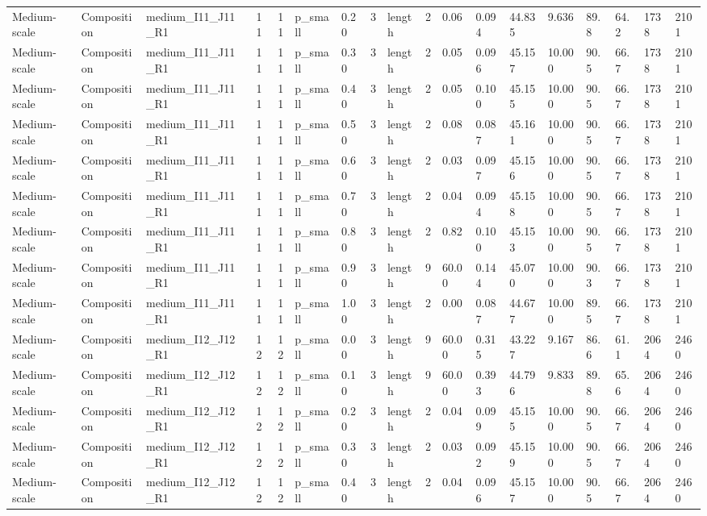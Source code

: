 \begin{longtable}{lllrrllllrllllllll}
Medium-scale & Composition & medium\_I11\_J11\_R1 & 11 & 11 & p\_small & 0.20 & 3 & length & 2 & 0.06 & 0.094 & 44.835 & 9.636 & 89.8 & 64.2 & 1738 & 2101 \\
Medium-scale & Composition & medium\_I11\_J11\_R1 & 11 & 11 & p\_small & 0.30 & 3 & length & 2 & 0.05 & 0.096 & 45.157 & 10.000 & 90.5 & 66.7 & 1738 & 2101 \\
Medium-scale & Composition & medium\_I11\_J11\_R1 & 11 & 11 & p\_small & 0.40 & 3 & length & 2 & 0.05 & 0.100 & 45.155 & 10.000 & 90.5 & 66.7 & 1738 & 2101 \\
Medium-scale & Composition & medium\_I11\_J11\_R1 & 11 & 11 & p\_small & 0.50 & 3 & length & 2 & 0.08 & 0.087 & 45.161 & 10.000 & 90.5 & 66.7 & 1738 & 2101 \\
Medium-scale & Composition & medium\_I11\_J11\_R1 & 11 & 11 & p\_small & 0.60 & 3 & length & 2 & 0.03 & 0.097 & 45.156 & 10.000 & 90.5 & 66.7 & 1738 & 2101 \\
Medium-scale & Composition & medium\_I11\_J11\_R1 & 11 & 11 & p\_small & 0.70 & 3 & length & 2 & 0.04 & 0.094 & 45.158 & 10.000 & 90.5 & 66.7 & 1738 & 2101 \\
Medium-scale & Composition & medium\_I11\_J11\_R1 & 11 & 11 & p\_small & 0.80 & 3 & length & 2 & 0.82 & 0.100 & 45.153 & 10.000 & 90.5 & 66.7 & 1738 & 2101 \\
Medium-scale & Composition & medium\_I11\_J11\_R1 & 11 & 11 & p\_small & 0.90 & 3 & length & 9 & 60.00 & 0.144 & 45.070 & 10.000 & 90.3 & 66.7 & 1738 & 2101 \\
Medium-scale & Composition & medium\_I11\_J11\_R1 & 11 & 11 & p\_small & 1.00 & 3 & length & 2 & 0.00 & 0.087 & 44.677 & 10.000 & 89.5 & 66.7 & 1738 & 2101 \\
Medium-scale & Composition & medium\_I12\_J12\_R1 & 12 & 12 & p\_small & 0.00 & 3 & length & 9 & 60.00 & 0.315 & 43.227 & 9.167 & 86.6 & 61.1 & 2064 & 2460 \\
Medium-scale & Composition & medium\_I12\_J12\_R1 & 12 & 12 & p\_small & 0.10 & 3 & length & 9 & 60.00 & 0.393 & 44.796 & 9.833 & 89.8 & 65.6 & 2064 & 2460 \\
Medium-scale & Composition & medium\_I12\_J12\_R1 & 12 & 12 & p\_small & 0.20 & 3 & length & 2 & 0.04 & 0.099 & 45.155 & 10.000 & 90.5 & 66.7 & 2064 & 2460 \\
Medium-scale & Composition & medium\_I12\_J12\_R1 & 12 & 12 & p\_small & 0.30 & 3 & length & 2 & 0.03 & 0.092 & 45.159 & 10.000 & 90.5 & 66.7 & 2064 & 2460 \\
Medium-scale & Composition & medium\_I12\_J12\_R1 & 12 & 12 & p\_small & 0.40 & 3 & length & 2 & 0.04 & 0.096 & 45.157 & 10.000 & 90.5 & 66.7 & 2064 & 2460 \\

\end{longtable}
